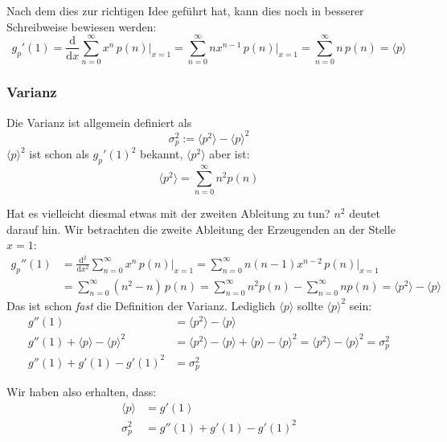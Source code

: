 \documentclass[a4paper]{article}
\newcommand{\dx}{\frac{\mathrm{d}}{\mathrm{d}x}}
\newcommand{\dxx}{\frac{\mathrm{d}^2}{\mathrm{d}x^2}}
\begin{document}
Nach dem dies zur richtigen Idee geführt hat,
kann dies noch in besserer Schreibweise bewiesen werden:
\begin{equation}
    g_p'(1) = \dx \sum_{n=0}^\infty x^n \, p(n) \Big|_{x=1}
            =     \sum_{n=0}^\infty n x^{n-1} \, p(n) \Big|_{x=1}
            =     \sum_{n=0}^\infty n \, p(n)
            = \langle p \rangle
\end{equation}


\subsubsection{Varianz}
Die Varianz ist allgemein definiert als
\begin{equation}
    \sigma_p^2 := \langle p^2 \rangle - \langle p \rangle^2
\end{equation}
$\langle p \rangle^2$ ist schon als $g_p'(1)^2$ bekannt,
$\langle p^2 \rangle$ aber ist:
\begin{equation}
    \langle p^2 \rangle = \sum_{n=0}^\infty n^2 p(n)
\end{equation}

Hat es vielleicht diesmal etwas mit der zweiten Ableitung zu tun?
$n^2$ deutet darauf hin. Wir betrachten die zweite Ableitung der Erzeugenden
an der Stelle $x=1$:
\begin{align*}
    g_p''(1) &= \dxx \sum_{n=0}^\infty x^n \, p(n) \Big|_{x=1}
             = \sum_{n=0}^\infty n(n-1) x^{n-2} \, p(n) \Big|_{x=1} \\
             &= \sum_{n=0}^\infty (n^2 - n) \, p(n)
             = \sum_{n=0}^\infty n^2 p(n) - \sum_{n=0}^\infty n p(n)
             = \langle p^2 \rangle - \langle p \rangle
\end{align*}
Das ist schon \emph{fast} die Definition der Varianz.
Lediglich $\langle p \rangle$ sollte $\langle p \rangle^2$ sein:
\begin{align*}
    g''(1) &= \langle p^2 \rangle - \langle p \rangle \\
    g''(1) + \langle p \rangle - \langle p \rangle^2  &= \langle p^2 \rangle - \langle p \rangle + \langle p \rangle - \langle p \rangle^2 = \langle p^2 \rangle - \langle p \rangle^2 = \sigma_p^2 \\
    g''(1) + g'(1) - g'(1)^2 &= \sigma_p^2
\end{align*}

Wir haben also erhalten, dass:
{\boldmath
\begin{align}
    \langle p \rangle &= g'(1) \label{eq:erwartungswert} \\
    \sigma_p^2 &= g''(1) + g'(1) - g'(1)^2 \label{eq:varianz}
\end{align}}
\end{document}
